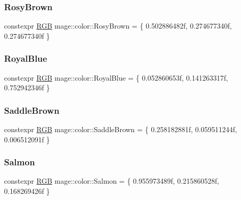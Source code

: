 \hypertarget{namespacemage_1_1color_ad16b7dcec432fa50bcc5b1436122c7d4}{}\label{namespacemage_1_1color_ad16b7dcec432fa50bcc5b1436122c7d4} 
\subsubsection{\texorpdfstring{Rosy\+Brown}{RosyBrown}}
{\footnotesize\ttfamily constexpr \hyperlink{structmage_1_1_r_g_b}{R\+GB} mage\+::color\+::\+Rosy\+Brown = \{ 0.\+502886482f, 0.\+274677340f, 0.\+274677340f \}}

\hypertarget{namespacemage_1_1color_a9a5a96e06db610b817a28c688424f787}{}\label{namespacemage_1_1color_a9a5a96e06db610b817a28c688424f787} 
\subsubsection{\texorpdfstring{Royal\+Blue}{RoyalBlue}}
{\footnotesize\ttfamily constexpr \hyperlink{structmage_1_1_r_g_b}{R\+GB} mage\+::color\+::\+Royal\+Blue = \{ 0.\+052860653f, 0.\+141263317f, 0.\+752942346f \}}

\hypertarget{namespacemage_1_1color_a86715103a7b44781b3193c280e61eac2}{}\label{namespacemage_1_1color_a86715103a7b44781b3193c280e61eac2} 
\subsubsection{\texorpdfstring{Saddle\+Brown}{SaddleBrown}}
{\footnotesize\ttfamily constexpr \hyperlink{structmage_1_1_r_g_b}{R\+GB} mage\+::color\+::\+Saddle\+Brown = \{ 0.\+258182881f, 0.\+059511244f, 0.\+006512091f \}}

\hypertarget{namespacemage_1_1color_a16d2bfe7068032f09cb8b8caeac239a8}{}\label{namespacemage_1_1color_a16d2bfe7068032f09cb8b8caeac239a8} 
\subsubsection{\texorpdfstring{Salmon}{Salmon}}
{\footnotesize\ttfamily constexpr \hyperlink{structmage_1_1_r_g_b}{R\+GB} mage\+::color\+::\+Salmon = \{ 0.\+955973489f, 0.\+215860528f, 0.\+168269426f \}}

